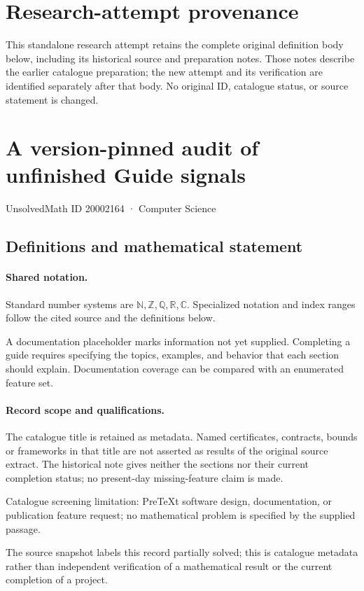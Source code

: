 \documentclass[11pt]{article}
\begin{document}
\section*{Research-attempt provenance}
This standalone research attempt retains the complete original definition body below,
including its historical source and preparation notes. Those notes describe the
earlier catalogue preparation; the new attempt and its verification are identified
separately after that body. No original ID, catalogue status, or source statement is changed.

\section{A version-pinned audit of unfinished Guide signals}\label{20002164}
{\small UnsolvedMath ID 20002164 · Computer Science}
\subsection{Definitions and mathematical statement}

\paragraph{Shared notation.}Standard number systems are $\mathbb N,\mathbb Z,\mathbb Q,\mathbb R,\mathbb C$. Specialized notation and index ranges follow the cited source and the definitions below.


A documentation placeholder marks information not yet supplied. Completing a guide requires specifying the topics, examples, and behavior that each section should explain. Documentation coverage can be compared with an enumerated feature set.
\paragraph{Record scope and qualifications.}
The catalogue title is retained as metadata. Named certificates, contracts, bounds or frameworks in that title are not asserted as results of the original source extract.
The historical note gives neither the sections nor their current completion status; no present-day missing-feature claim is made.

Catalogue screening limitation: PreTeXt software design, documentation, or publication feature request; no mathematical problem is specified by the supplied passage.

The source snapshot labels this record partially solved; this is catalogue metadata rather than independent verification of a mathematical result or the current completion of a project.
\end{document}
